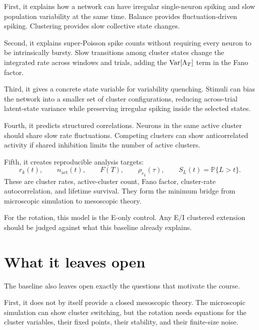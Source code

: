 First, it explains how a network can have irregular single-neuron spiking and slow population variability at the same time. Balance provides fluctuation-driven spiking. Clustering provides slow collective state changes.

Second, it explains super-Poisson spike counts without requiring every neuron to be intrinsically bursty. Slow transitions among cluster states change the integrated rate across windows and trials, adding the $\operatorname{Var}[\Lambda_T]$ term in the Fano factor.

Third, it gives a concrete state variable for variability quenching. Stimuli can bias the network into a smaller set of cluster configurations, reducing across-trial latent-state variance while preserving irregular spiking inside the selected states.

Fourth, it predicts structured correlations. Neurons in the same active cluster should share slow rate fluctuations. Competing clusters can show anticorrelated activity if shared inhibition limits the number of active clusters.

Fifth, it creates reproducible analysis targets:
%
\begin{equation}
  r_k(t),
  \qquad
  n_{\mathrm{act}}(t),
  \qquad
  F(T),
  \qquad
  \rho_{r_k}(\tau),
  \qquad
  S_L(t)=\mathbb{P}\{L>t\}.
  \label{eq:lkd-reproduction-targets}
\end{equation}
%
These are cluster rates, active-cluster count, Fano factor, cluster-rate autocorrelation, and lifetime survival. They form the minimum bridge from microscopic simulation to mesoscopic theory.

For the rotation, this model is the E-only control. Any E/I clustered extension should be judged against what this baseline already explains.

\section{What it leaves open}
\label{sec:model-leaves-open}

The baseline also leaves open exactly the questions that motivate the course.

First, it does not by itself provide a closed mesoscopic theory. The microscopic simulation can show cluster switching, but the rotation needs equations for the cluster variables, their fixed points, their stability, and their finite-size noise.


